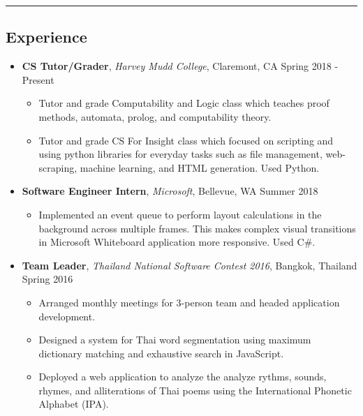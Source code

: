 \documentclass[10.5pt,letterpaper]{article}
\begin{document}
\hrule
\vspace{-0.95em}
\subsection*{Experience}
  \begin{itemize}
    \parskip=-0.45em

    \item[]
    {\textbf{CS Tutor/Grader}, \textit{Harvey Mudd College}, Claremont, CA \hfill {Spring 2018 - Present}}
    \begin{itemize}[label=\textbullet]
      \itemsep0.1em
      \item Tutor and grade Computability and Logic class which teaches proof methods, automata, prolog,
      and computability theory. 
      \item Tutor and grade CS For Insight class which focused 
      on scripting and using python libraries for everyday tasks such as file management, web-scraping, 
      machine learning, and HTML generation. Used Python.
    \end{itemize}
    \vspace{0.1em}
    \item[]
    {\textbf{Software Engineer Intern}, \textit{Microsoft}, Bellevue, WA \hfill {Summer 2018}}
    \begin{itemize}[label=\textbullet]
      \itemsep0.1em
      \item Implemented an event queue to perform layout calculations in the background 
      across multiple frames. This makes complex visual transitions in Microsoft Whiteboard application
      more responsive. Used C\#.
    \end{itemize}
    \vspace{0.1em}
    \item[]
    {\textbf{Team Leader}, \textit{Thailand National Software Contest 2016}, Bangkok, Thailand \hfill {Spring 2016}}
    \begin{itemize}[label=\textbullet]
      \itemsep0.1em
      \item Arranged monthly meetings for 3-person team and headed application development.
      \item Designed a system for Thai word segmentation using maximum dictionary matching and exhaustive 
      search in JavaScript.
      \item Deployed a web application to analyze the analyze rythms, sounds, rhymes, and alliterations of Thai 
      poems using the International Phonetic Alphabet (IPA).
      
    \end{itemize}


  \end{itemize}
  
\end{document}
